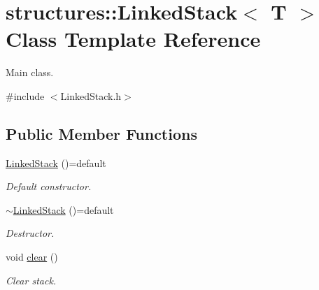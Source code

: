 \hypertarget{classstructures_1_1_linked_stack}{}\section{structures\+:\+:Linked\+Stack$<$ T $>$ Class Template Reference}
\label{classstructures_1_1_linked_stack}


Main class.  




{\ttfamily \#include $<$Linked\+Stack.\+h$>$}

\subsection*{Public Member Functions}
\begin{DoxyCompactItemize}
\item 
\mbox{\label{classstructures_1_1_linked_stack_a4554f29b665f204c5ddc93b946f65381}} 
\mbox{\hyperlink{classstructures_1_1_linked_stack_a4554f29b665f204c5ddc93b946f65381}{Linked\+Stack}} ()=default
\begin{DoxyCompactList}\small\item\em Default constructor. \end{DoxyCompactList}\item 
\mbox{\label{classstructures_1_1_linked_stack_ab3742f25c26cac6134f248e5bb906dae}} 
\mbox{\hyperlink{classstructures_1_1_linked_stack_ab3742f25c26cac6134f248e5bb906dae}{$\sim$\+Linked\+Stack}} ()=default
\begin{DoxyCompactList}\small\item\em Destructor. \end{DoxyCompactList}\item 
\mbox{\label{classstructures_1_1_linked_stack_a56cc909b4a3a0ff7a589f35032ca0ba8}} 
void \mbox{\hyperlink{classstructures_1_1_linked_stack_a56cc909b4a3a0ff7a589f35032ca0ba8}{clear}} ()
\begin{DoxyCompactList}\small\item\em Clear stack. \end{DoxyCompactList}\item 
\mbox{\label{classstructures_1_1_linked_stack_adb8c6b231298ac25b17ba692d510a3fc}} 

\end{DoxyCompactItemize}
